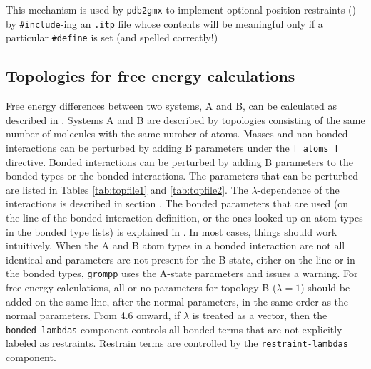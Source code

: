 This mechanism is used by {\tt pdb2gmx} to implement optional position
restraints () by {\tt \#include}-ing an {\tt .itp} file whose contents
will be meaningful only if a particular {\tt \#define} is set (and spelled
correctly!)

\subsection{Topologies for free energy calculations}
Free energy differences between two systems, A and B, can be calculated as
described in .
Systems A and B are described by topologies
consisting of the same number of molecules with the same number of
atoms. Masses and non-bonded interactions can be perturbed by adding B
parameters under the {\tt [~atoms~]} directive. Bonded interactions can be 
perturbed by adding B parameters to the bonded types or the bonded
interactions. The parameters that can be perturbed are listed in  
Tables \ref{tab:topfile1} and \ref{tab:topfile2}.
The $\lambda$-dependence of the interactions is described
in section .
The bonded parameters that are used (on the line of the bonded
interaction definition, or the ones looked up on atom types
in the bonded type lists) is explained in .
In most cases, things should work intuitively.
When the A and B atom types in a bonded interaction
are not all identical and parameters are not present for the B-state,
either on the line or in the bonded types,
{\tt grompp} uses the A-state parameters and issues a warning.
For free energy calculations, all or no parameters for topology B
($\lambda = 1$) should be added on the same line, after the normal
parameters, in the same order as the normal parameters.
From {\gromacs} 4.6 onward, if $\lambda$ is treated as a vector, then
the {\tt bonded-lambdas} component controls all bonded terms that are
not explicitly labeled as restraints.  Restrain terms are controlled
by the {\tt restraint-lambdas} component.

